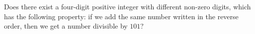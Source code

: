 Does there exist a four-digit positive integer with different non-zero digits, which has the following property: if we add the same number written in the reverse order, then we get a number divisible by $101$?